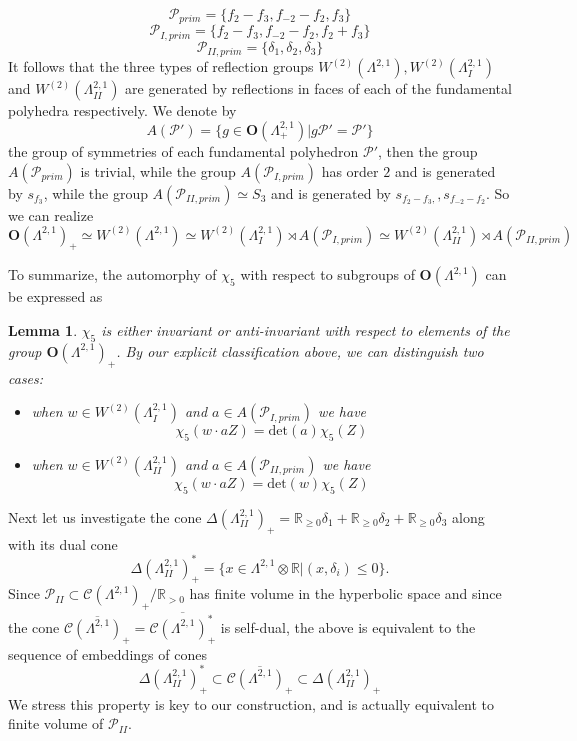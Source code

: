 \documentclass[9pt]{amsart} \usepackage[utf8]{inputenc}
\newtheorem{lemma}{Lemma}
\newcommand{\R}{\mathbb{R}} \newcommand{\La}{\Lambda}
\newcommand{\Orth}{\mathbf{O}}
\newcommand{\Cone}{\mathcal{C}}
\newcommand{\Poly}{\mathcal{P}}
\begin{document}
 $$\Poly_{prim} = \{f_2 - f_3, f_{-2} - f_2, f_3\}$$
 $$\Poly_{I,prim} = \{f_2 -f_3, f_{-2} - f_2, f_2 + f_3\}$$
 $$\Poly_{II,prim} = \{\delta_1, \delta_2, \delta_3\}$$
It follows that the three types of reflection groups $W^{(2)}(\La^{2,1}),
W^{(2)}(\La^{2,1}_I)$ and $W^{(2)}(\La^{2,1}_{II})$ are generated by
reflections in faces of each of the fundamental polyhedra respectively. We denote
by $$A(\Poly') = \{g \in \Orth(\La^{2,1}_+) | g \Poly' = \Poly' \}$$ the
group of symmetries of each fundamental polyhedron $\Poly'$, then the group
$A(\Poly_{prim})$ is trivial, while the group $A(\Poly_{I,prim})$ has order
$2$ and is generated by $s_{f_3}$, while the group $A(\Poly_{II,prim})
\simeq S_3$ and is generated by $s_{f_2 -f_3,}, s_{f_{-2} - f_2}$. So we
can realize $$\Orth(\La^{2,1})_+ \simeq W^{(2)}(\La^{2,1}) \simeq
W^{(2)}(\La^{2,1}_I) \rtimes A(\Poly_{I,prim}) \simeq
W^{(2)}(\La^{2,1}_{II}) \rtimes A(\Poly_{II,prim})$$

To summarize, the automorphy of $\chi_5$ with respect to subgroups of
$\Orth(\La^{2,1})$ can be expressed as

\begin{lemma}
$\chi_5$ is either invariant or anti-invariant with respect to elements
of the group $\Orth(\La^{2,1})_+$. By our explicit classification above, we can
distinguish two cases:
\begin{itemize}
  \item when $w \in W^{(2)}(\La^{2,1}_I)$ and $a \in A(\Poly_{I,prim})$ we
  have
  $$\chi_5(w \cdot a Z) = \text{det}(a) \chi_5(Z)$$
  \item when $w \in W^{(2)}(\La^{2,1}_{II})$ and $a \in A(\Poly_{II,prim})$ we
  have
  $$\chi_5(w \cdot a Z) = \text{det}(w) \chi_5(Z)$$
\end{itemize}

\end{lemma}

Next let us investigate the cone $\Delta(\La^{2,1}_{II})_+ = \R_{\geq 0} \delta_1 + \R_{\geq 0} \delta_2
+ \R_{\geq 0} \delta_3$ along with its dual cone
$$\Delta(\La^{2,1}_{II})_+^* = \{ x \in \La^{2,1} \otimes \R | (x,
\delta_i) \leq 0 \}.$$ Since $\Poly_{II} \subset \Cone(\La^{2,1})_+ /
\R_{>0}$ has finite volume in the hyperbolic space and since the cone
$\overline{\Cone(\La^{2,1})_+} = \overline{\Cone(\La^{2,1})_+^*}$ is
self-dual, the above is equivalent to the sequence of embeddings of
cones
$$\Delta(\La^{2,1}_{II})_+^* \subset
\overline{\Cone(\La^{2,1})_+} \subset  \Delta(\La^{2,1}_{II})_+$$
We stress this property is key to our construction, and is actually equivalent to
finite volume of $\Poly_{II}$.
\end{document}
